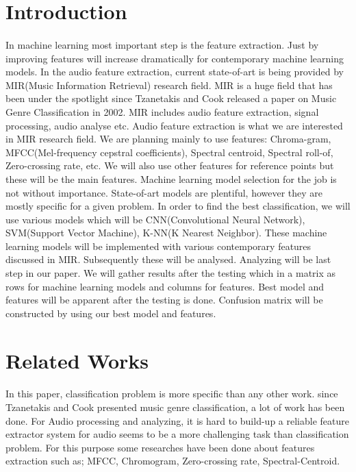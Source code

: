 \documentclass[10pt,twocolumn,letterpaper]{article}
\begin{document}
\section{Introduction}
\paragraph{}In machine learning most important step is the feature extraction. Just by improving features will increase dramatically for contemporary machine learning models. In the audio feature extraction, current state-of-art is being provided by MIR(Music Information Retrieval) research field. MIR is a huge field that has been under the spotlight since Tzanetakis and Cook released a paper on Music Genre Classification in 2002\cite{genre_classification_tp}. MIR includes audio feature extraction, signal processing, audio analyse etc. Audio feature extraction is what we are interested in MIR research field. We are planning mainly to use features: Chroma-gram, MFCC(Mel-frequency cepstral coefficients), Spectral centroid, Spectral roll-of, Zero-crossing rate, etc. We will also use other features for reference points but these will be the main features.
Machine learning model selection for the job is not without importance. State-of-art models are plentiful, however they are mostly specific for a given problem. In order to find the best classification, we will use various models which will be CNN(Convolutional Neural Network), SVM(Support Vector Machine), K-NN(K Nearest Neighbor). These machine learning models will be implemented with various contemporary features discussed in MIR. Subsequently these will be analysed.   
Analyzing will be last step in our paper. We will gather results after the testing which in a matrix as rows for machine learning models and columns for features. Best model and features will be apparent after the testing is done. Confusion matrix will be constructed by using our best model and features.   

\section{Related Works}

\paragraph{}In this paper, classification problem is more specific than any other work. since Tzanetakis and Cook presented music genre classification\cite{genre_classification_tp}, a lot of work has been done. 
For Audio processing and analyzing, it is hard to build-up a reliable feature extractor system for audio seems to be a more challenging task than classification problem.
For this purpose some researches have been done about features extraction such as; MFCC\cite{mffc}, Chromogram\cite{chroma}, Zero-crossing rate, Spectral-Centroid\cite{spectral_centroid}.
\end{document}
